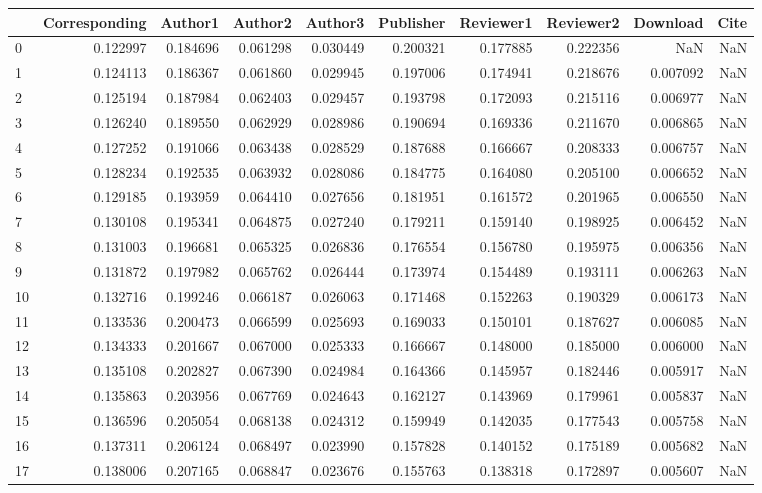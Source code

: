 \begin{tabular}{lrrrrrrrrr}
\toprule
 & Corresponding & Author1 & Author2 & Author3 & Publisher & Reviewer1 & Reviewer2 & Download & Cite \\
\midrule
0 & 0.122997 & 0.184696 & 0.061298 & 0.030449 & 0.200321 & 0.177885 & 0.222356 & NaN & NaN \\
1 & 0.124113 & 0.186367 & 0.061860 & 0.029945 & 0.197006 & 0.174941 & 0.218676 & 0.007092 & NaN \\
2 & 0.125194 & 0.187984 & 0.062403 & 0.029457 & 0.193798 & 0.172093 & 0.215116 & 0.006977 & NaN \\
3 & 0.126240 & 0.189550 & 0.062929 & 0.028986 & 0.190694 & 0.169336 & 0.211670 & 0.006865 & NaN \\
4 & 0.127252 & 0.191066 & 0.063438 & 0.028529 & 0.187688 & 0.166667 & 0.208333 & 0.006757 & NaN \\
5 & 0.128234 & 0.192535 & 0.063932 & 0.028086 & 0.184775 & 0.164080 & 0.205100 & 0.006652 & NaN \\
6 & 0.129185 & 0.193959 & 0.064410 & 0.027656 & 0.181951 & 0.161572 & 0.201965 & 0.006550 & NaN \\
7 & 0.130108 & 0.195341 & 0.064875 & 0.027240 & 0.179211 & 0.159140 & 0.198925 & 0.006452 & NaN \\
8 & 0.131003 & 0.196681 & 0.065325 & 0.026836 & 0.176554 & 0.156780 & 0.195975 & 0.006356 & NaN \\
9 & 0.131872 & 0.197982 & 0.065762 & 0.026444 & 0.173974 & 0.154489 & 0.193111 & 0.006263 & NaN \\
10 & 0.132716 & 0.199246 & 0.066187 & 0.026063 & 0.171468 & 0.152263 & 0.190329 & 0.006173 & NaN \\
11 & 0.133536 & 0.200473 & 0.066599 & 0.025693 & 0.169033 & 0.150101 & 0.187627 & 0.006085 & NaN \\
12 & 0.134333 & 0.201667 & 0.067000 & 0.025333 & 0.166667 & 0.148000 & 0.185000 & 0.006000 & NaN \\
13 & 0.135108 & 0.202827 & 0.067390 & 0.024984 & 0.164366 & 0.145957 & 0.182446 & 0.005917 & NaN \\
14 & 0.135863 & 0.203956 & 0.067769 & 0.024643 & 0.162127 & 0.143969 & 0.179961 & 0.005837 & NaN \\
15 & 0.136596 & 0.205054 & 0.068138 & 0.024312 & 0.159949 & 0.142035 & 0.177543 & 0.005758 & NaN \\
16 & 0.137311 & 0.206124 & 0.068497 & 0.023990 & 0.157828 & 0.140152 & 0.175189 & 0.005682 & NaN \\
17 & 0.138006 & 0.207165 & 0.068847 & 0.023676 & 0.155763 & 0.138318 & 0.172897 & 0.005607 & NaN \\

\end{tabular}
